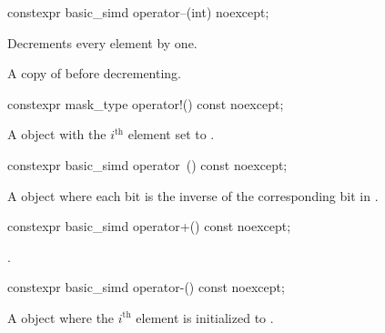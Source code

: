 \begin{itemdecl}
constexpr basic_simd operator--(int) noexcept;
\end{itemdecl}

\begin{itemdescr}
  \pnum{}

  \pnum\effects
  Decrements every element by one.

  \pnum\returns
  A copy of  before decrementing.
\end{itemdescr}

\begin{itemdecl}
constexpr mask_type operator!() const noexcept;
\end{itemdecl}

\begin{itemdescr}
  \pnum{}

  \pnum\returns
  A  object with the $i^\text{th}$ element set to  \foralli.
\end{itemdescr}

\begin{itemdecl}
constexpr basic_simd operator~() const noexcept;
\end{itemdecl}

\begin{itemdescr}
  \pnum{}

  \pnum\returns
  A  object where each bit is the inverse of the corresponding bit in .
\end{itemdescr}

\begin{itemdecl}
constexpr basic_simd operator+() const noexcept;
\end{itemdecl}

\begin{itemdescr}
  \pnum{}

  \pnum\returns
  .
\end{itemdescr}

\begin{itemdecl}
constexpr basic_simd operator-() const noexcept;
\end{itemdecl}

\begin{itemdescr}
  \pnum{}

  \pnum\returns
  A  object where the $i^\text{th}$ element is initialized to  \foralli.
\end{itemdescr}

